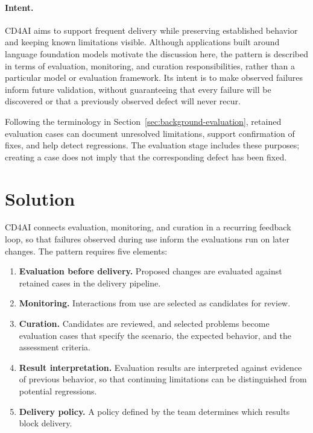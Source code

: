 \paragraph{Intent.}
CD4AI aims to support frequent delivery while preserving established behavior
and keeping known limitations visible. Although applications built around
language foundation models motivate the discussion here, the pattern is
described in terms of evaluation, monitoring, and curation responsibilities,
rather than a particular model or evaluation framework. Its intent is to make
observed failures inform future validation, without guaranteeing that every
failure will be discovered or that a previously observed defect will never
recur.

Following the terminology in Section~\ref{sec:background-evaluation}, retained
evaluation cases can document unresolved limitations, support confirmation of
fixes, and help detect regressions. The evaluation stage includes these
purposes; creating a case does not imply that the corresponding defect has been
fixed.

\section{Solution}
\label{sec:cd4ai-overview}
\label{sec:cd4ai-solution}

CD4AI connects evaluation, monitoring, and curation in a recurring feedback
loop, so that failures observed during use inform the evaluations run on later
changes. The pattern requires five elements:

\begin{enumerate}
  \item \textbf{Evaluation before delivery.} Proposed changes are evaluated
    against retained cases in the delivery pipeline.
  \item \textbf{Monitoring.} Interactions from use are selected as candidates
    for review.
  \item \textbf{Curation.} Candidates are reviewed, and selected problems
    become evaluation cases that specify the scenario, the expected behavior,
    and the assessment criteria.
  \item \textbf{Result interpretation.} Evaluation results are interpreted
    against evidence of previous behavior, so that continuing limitations can
    be distinguished from potential regressions.
  \item \textbf{Delivery policy.} A policy defined by the team determines
    which results block delivery.
\end{enumerate}

